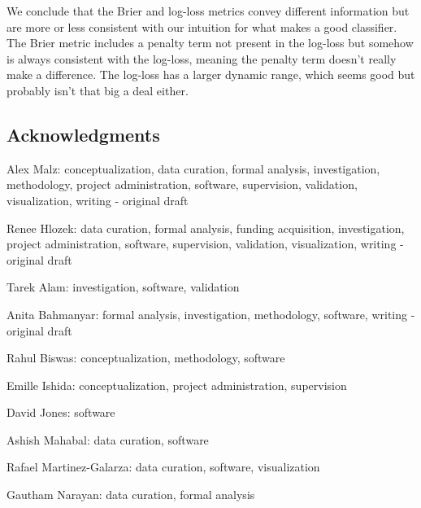 \documentclass[\docopts]{\docclass}
\begin{document}
We conclude that the Brier and log-loss metrics convey different information but are more or less consistent with our intuition for what makes a good classifier. The Brier metric includes a penalty term not present in the log-loss but somehow is always consistent with the log-loss, meaning the penalty term doesn't really make a difference. The log-loss has a larger dynamic range, which seems good but probably isn't that big a deal either.


\subsection*{Acknowledgments}




Alex Malz: conceptualization, data curation, formal analysis, investigation, methodology, project administration, software, supervision, validation, visualization, writing - original draft

Renee Hlozek: data curation, formal analysis, funding acquisition, investigation, project administration, software, supervision, validation, visualization, writing - original draft

Tarek Alam: investigation, software, validation

Anita Bahmanyar: formal analysis, investigation, methodology, software, writing - original draft

Rahul Biswas: conceptualization, methodology, software

Emille Ishida: conceptualization, project administration, supervision

David Jones: software

Ashish Mahabal: data curation, software

Rafael Martinez-Galarza: data curation, software, visualization

Gautham Narayan: data curation, formal analysis
\end{document}
